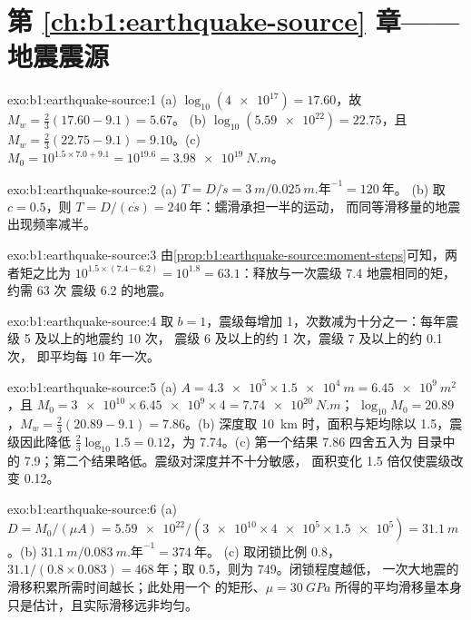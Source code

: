 \section*{第 \ref{ch:b1:earthquake-source} 章——地震震源}

\begin{solution}{exo:b1:earthquake-source:1}
(a) $\log_{10}(\num{4e17}) = 17.60$，故 $M_w = \tfrac23(17.60 - 9.1) = 5.67$。
(b) $\log_{10}(\num{5.59e22}) = 22.75$，且 $M_w = \tfrac23(22.75 - 9.1) =
9.10$。(c) $M_0 = 10^{1.5\times7.0 + 9.1} = 10^{19.6} = \qty{3.98e19}{N.m}$。
\end{solution}

\begin{solution}{exo:b1:earthquake-source:2}
(a) $T = D/\dot s = \qty{3}{m}/\qty{0.025}{m.\text{年}^{-1}} = \qty{120}{\text{年}}$。
(b) 取 $c = 0.5$，则 $T = D/(c\dot s) = \qty{240}{\text{年}}$：蠕滑承担一半的运动，
而同等滑移量的地震出现频率减半。
\end{solution}

\begin{solution}{exo:b1:earthquake-source:3}
由\cref{prop:b1:earthquake-source:moment-steps}可知，两者矩之比为
$10^{1.5\times(7.4 - 6.2)} = 10^{1.8} = 63.1$：释放与一次震级 7.4 地震相同的矩，约需 63 次
震级 6.2 的地震。
\end{solution}

\begin{solution}{exo:b1:earthquake-source:4}
取 $b = 1$，震级每增加 1，次数减为十分之一：每年震级 5 及以上的地震约 10 次，
震级 6 及以上的约 1 次，震级 7 及以上的约 0.1 次，
即平均每 10 年一次。
\end{solution}

\begin{solution}{exo:b1:earthquake-source:5}
(a) $A = \num{4.3e5} \times \qty{1.5e4}{m} = \qty{6.45e9}{m^2}$，且
$M_0 = \num{3e10}\times\num{6.45e9}\times4 = \qty{7.74e20}{N.m}$；
$\log_{10}M_0 = 20.89$，$M_w = \tfrac23(20.89 - 9.1) = 7.86$。(b) 深度取
\qty{10}{km} 时，面积与矩均除以 1.5，震级因此降低
$\tfrac23\log_{10}1.5 = 0.12$，为 7.74。(c) 第一个结果 7.86 四舍五入为
目录中的 7.9；第二个结果略低。震级对深度并不十分敏感，
面积变化 1.5 倍仅使震级改变 0.12。
\end{solution}

\begin{solution}{exo:b1:earthquake-source:6}
(a) $D = M_0/(\mu A) = \num{5.59e22}/(\num{3e10}\times\num{4e5}\times\num{1.5e5})
= \qty{31.1}{m}$。(b) $\qty{31.1}{m}/\qty{0.083}{m.\text{年}^{-1}} = \qty{374}{\text{年}}$。
(c) 取闭锁比例 0.8，$31.1/(0.8\times0.083) = \qty{468}{\text{年}}$；取
0.5，则为 \qty{749}{}。闭锁程度越低，
一次大地震的滑移积累所需时间越长；此处用一个
 的矩形、$\mu = \qty{30}{GPa}$ 所得的平均滑移量本身
只是估计，且实际滑移远非均匀。
\end{solution}

